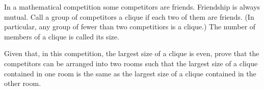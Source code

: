 In a mathematical competition some competitors are friends. Friendship is always mutual. Call a group of competitors a clique if each two of them are friends. (In particular, any group of fewer than two competitiors is a clique.) The number of members of a clique is called its size.

Given that, in this competition, the largest size of a clique is even, prove that the competitors can be arranged into two rooms such that the largest size of a clique contained in one room is the same as the largest size of a clique contained in the other room.